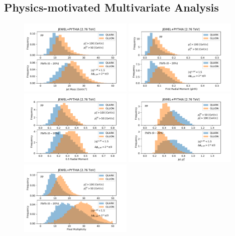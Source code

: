 \documentclass[notoc,preprintnumbers]{JHEP3}
\begin{document}
\subsection{Physics-motivated Multivariate Analysis}
\label{sec:mva}

\begin{figure}[h]
	   \centering
	   \includegraphics[width=0.48\textwidth]{plots/JEWEL_pp_pbpb020_jetMass}
	   \includegraphics[width=0.48\textwidth]{plots/JEWEL_pp_pbpb020_firstRadialMoment}
	   \includegraphics[width=0.48\textwidth]{plots/JEWEL_pp_pbpb020_halfRadialMoment}
	   \includegraphics[width=0.48\textwidth]{plots/JEWEL_pp_pbpb020_pTD}
	   \includegraphics[width=0.48\textwidth]{plots/JEWEL_pp_pbpb020_NumberjetConstituents}

\end{figure}
\end{document}

